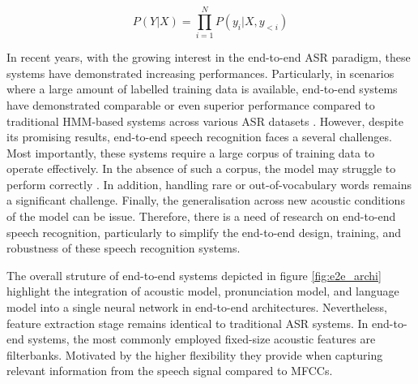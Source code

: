  \begin{equation}
     P(Y|X) = \prod_{i=1}^{N}P(y_i | X,y_{<i})
 \end{equation}

 In recent years, with the growing interest in the end-to-end ASR paradigm, these systems have demonstrated increasing performances. Particularly, in scenarios where a large amount of labelled training data is available,  end-to-end systems have demonstrated comparable or even superior performance compared to traditional HMM-based systems across various ASR datasets \cite{hannun2014deep,hmmvse2e}. However, despite its promising results, end-to-end speech recognition faces a several challenges. Most importantly, these systems require a large corpus of training data to operate effectively. In the absence of such a corpus, the model may struggle to perform correctly \cite{hmm-end2end}. In addition, handling rare or out-of-vocabulary words remains a significant challenge. Finally, the generalisation across new acoustic conditions of the model can be issue. Therefore, there is a need of research on end-to-end speech recognition, particularly to simplify the end-to-end design, training, and robustness of these speech recognition systems.
 
 The overall struture of end-to-end systems depicted in figure \ref{fig:e2e_archi} highlight the integration of acoustic model, pronunciation model, and language model into a single neural network in end-to-end architectures. Nevertheless, feature extraction stage remains identical to traditional ASR systems. In end-to-end systems, the most commonly employed fixed-size acoustic features are filterbanks. Motivated by the higher flexibility they provide when capturing relevant information from the speech signal compared to MFCCs.

